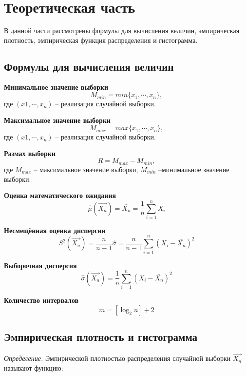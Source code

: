 \chapter{Теоретическая часть}
В данной части рассмотрены формулы для вычисления величин, эмпирическая плотность, эмпирическая функция распределения и гистограмма.

\section{Формулы для вычисления величин}
\textbf{Минимальное значение выборки}
\begin{equation}
    M_{min} = min\{x_1,\cdots,x_n\},
\end{equation}
 где $(x1,\cdots,x_n)$ -- реализация случайной выборки.

 \textbf{Максимальное значение выборки}
 \begin{equation}
     M_{max} = max\{x_1,\cdots,x_n\},
 \end{equation}
 где $(x1,\cdots,x_n)$ -- реализация случайной выборки.

 \textbf{Размах выборки}
 \begin{equation}
     R = M_{max} - M_{min},
 \end{equation}
где $M_{max}$ -- максимальное значение выборки, $M_{min}$ --минимальное значение выборки.

\textbf{Оценка математического ожидания}
\begin{equation}
    \hat{\mu}(\vec{X_n}) = \bar{X_n}=\frac{1}{n}\sum_{i=1}^n X_i
\end{equation}

\textbf{Несмещённая оценка дисперсии}
\begin{equation}
    S^2(\vec{X_n}) = \frac{n}{n-1} \hat{\sigma} = \frac{n}{n-1}\sum_{i=1}^n (X_i - \bar{X_n})^2
\end{equation}

\textbf{Выборочная дисперсия}
\begin{equation}
    \hat{\sigma}(\vec{X_n}) = \frac{1}{n}\sum_{i=1}^n(X_i - \bar{X_n})^2
\end{equation}

\textbf{Количество интервалов}
\begin{equation}
    m = [\log_{2}n] + 2
\end{equation}

\section{Эмпирическая плотность и гистограмма}
\textit{Определение.} Эмпирической плотностью распределения случайной
выборки $\Vec{X_n}$ называют функцию:

